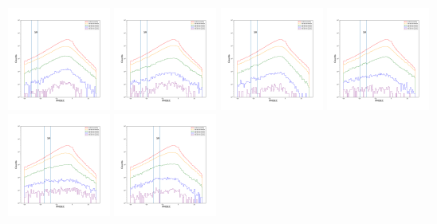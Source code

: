 \documentclass[12pt,prd]{article}
\begin{document}
\begin{figure}[h!]
\centering
\includegraphics[width=0.24\textwidth]{../figures/scanning_plotsgaiascan_l45_0_b82_2_ra201_5_dec28_5_npy_0.pdf}
\includegraphics[width=0.24\textwidth]{../figures/scanning_plotsgaiascan_l45_0_b82_2_ra201_5_dec28_5_npy_1.pdf}
\includegraphics[width=0.24\textwidth]{../figures/scanning_plotsgaiascan_l45_0_b82_2_ra201_5_dec28_5_npy_2.pdf}
\includegraphics[width=0.24\textwidth]{../figures/scanning_plotsgaiascan_l45_0_b82_2_ra201_5_dec28_5_npy_3.pdf}
\includegraphics[width=0.24\textwidth]{../figures/scanning_plotsgaiascan_l45_0_b82_2_ra201_5_dec28_5_npy_4.pdf}
\includegraphics[width=0.24\textwidth]{../figures/scanning_plotsgaiascan_l45_0_b82_2_ra201_5_dec28_5_npy_5.pdf}

\end{figure}
\end{document}

